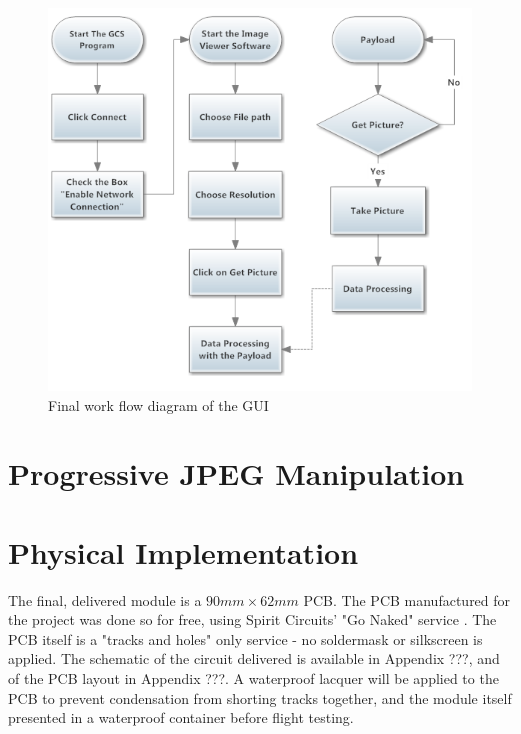 \begin{figure}[!hbtp]
\begin{center}
\includegraphics[scale=1]{finalWorkFlow.PNG} 
\end{center}
\caption{Final work flow diagram of the GUI\label{GUI_finalWorkFlow}}
\end{figure}
\section{Progressive JPEG Manipulation}

\section{Physical Implementation}
\label{sec:PCB-implementation}

The final, delivered module is a $90mm\times62mm$ PCB. The PCB manufactured 
for the project was done so for free, using Spirit Circuits' "Go Naked"
service \cite{go-naked}. The PCB itself is a "tracks and holes" only service 
- no soldermask or silkscreen is applied. The schematic of the circuit 
delivered is available in Appendix ???, and of the PCB layout in Appendix 
???. A waterproof lacquer will be applied to the PCB to prevent condensation 
from shorting tracks together, and the module itself presented in a 
waterproof container before flight testing.

